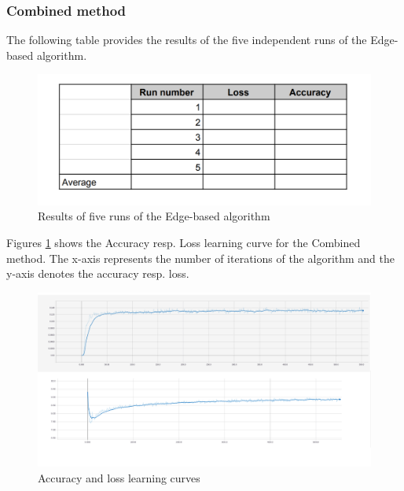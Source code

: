 \subsubsection{Combined method}

The following table provides the results of the five independent runs of the Edge-based algorithm.

\begin{figure}[h!]
    \centering
    \includegraphics[scale=0.22]{figures/results.png}
    \caption{Results of five runs of the Edge-based algorithm}
    \label{fig:combined_met_results}
\end{figure}

Figures \ref{fig:combined_met_results} shows the Accuracy resp. Loss learning curve for the Combined method. The x-axis represents the number of iterations of the algorithm and the y-axis denotes the accuracy resp. loss.

\begin{figure}[h!]
    \centering
    \includegraphics[scale=0.18]{figures/learning_curve.png}
    \caption{Accuracy and loss learning curves}
    \label{fig:edge_based_learning_curve_accuracy}
\end{figure}